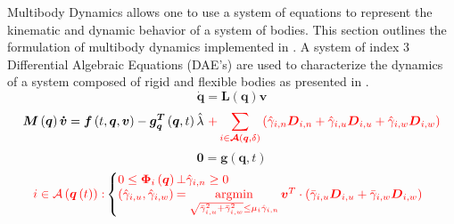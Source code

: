 \documentclass[12pt,onecolumn]{report}
\newcommand{\CHRONO}{{\sffamily{{Chrono}}}}
\DeclareMathOperator*{\argminB}{argmin}
\begin{document}
Multibody Dynamics allows one to use a system of equations to represent the kinematic and dynamic behavior of a system of bodies. This section outlines the formulation of multibody dynamics implemented in {\CHRONO}. A system of index 3 Differential Algebraic Equations (DAE's) are used to characterize the dynamics of a system composed of rigid and flexible bodies as presented in \cite{Chrono2016}.
%
\begin{equation}\label{e:LinTrans}
\boldsymbol{\dot{q}}= \boldsymbol{L}\left(\boldsymbol{q}\right)\boldsymbol{v}
\end{equation}
%
\begin{equation}\label{e:ForceBalance}
\boldsymbol{M}\left(\boldsymbol{q}\right)\boldsymbol{\dot{v}} = \boldsymbol{f}\left(t,\boldsymbol{q},\boldsymbol{v}\right) - \boldsymbol{g^T_q} \left(\boldsymbol{q},t\right)\hat{\lambda}  \textcolor{red}{~+ \sum\limits_{i \in \boldsymbol{\mathcal{A}}\left(\boldsymbol{q},\delta\right) }\left(\hat\gamma_{i,n}\boldsymbol{D}_{i,n} + \hat\gamma_{i,u}\boldsymbol{D}_{i,u} + \hat\gamma_{i,w}\boldsymbol{D}_{i,w}\right)}
\end{equation}
%
\begin{equation}\label{e:Constraints}
\boldsymbol{0} = \boldsymbol{g}\left(\boldsymbol{q},t\right)
\end{equation}
%
{\color{red}\begin{equation}\label{e:Inequalities}
\textcolor{red}{i \in \mathcal{A}\left(\boldsymbol{q}\left(t\right)\right):}
\left\{
     \begin{array}{@{}l@{\thinspace}l}
      \textcolor{red}{0\le\boldsymbol{\Phi}_i \left(\boldsymbol{q}\right)} &\textcolor{red}{\bot \hat\gamma_{i,n}  \ge 0}\\
      \textcolor{red}{\left(\hat\gamma_{i,u},\hat\gamma_{i,w}\right)} &\textcolor{red}{= \argminB\limits_{\sqrt{\bar\gamma_{i,u}^2 + \bar\gamma_{i,w}^2}\le\mu_i \hat\gamma_{i,n}} \boldsymbol{v}^T \cdot \left(\bar\gamma_{i,u}\boldsymbol{D}_{i,u} + \bar\gamma_{i,w}\boldsymbol{D}_{i,w}\right)} \\
% 
     \end{array}
\right . 
\end{equation}}
\end{document}
